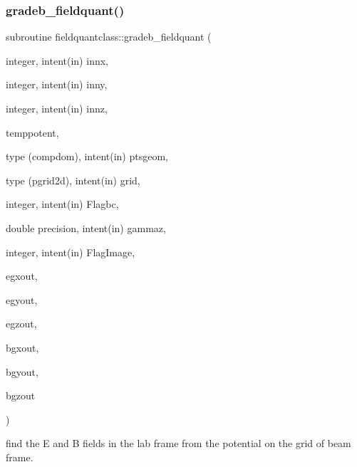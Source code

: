 \subsubsection{\texorpdfstring{gradeb\_fieldquant()}{gradeb\_fieldquant()}}
{\footnotesize\ttfamily subroutine fieldquantclass\+::gradeb\+\_\+fieldquant (\begin{DoxyParamCaption}\item[{integer, intent(in)}]{innx,  }\item[{integer, intent(in)}]{inny,  }\item[{integer, intent(in)}]{innz,  }\item[{}]{temppotent,  }\item[{type (compdom), intent(in)}]{ptsgeom,  }\item[{type (pgrid2d), intent(in)}]{grid,  }\item[{integer, intent(in)}]{Flagbc,  }\item[{double precision, intent(in)}]{gammaz,  }\item[{integer, intent(in)}]{Flag\+Image,  }\item[{}]{egxout,  }\item[{}]{egyout,  }\item[{}]{egzout,  }\item[{}]{bgxout,  }\item[{}]{bgyout,  }\item[{}]{bgzout }\end{DoxyParamCaption})}



find the E and B fields in the lab frame from the potential on the grid of beam frame. 

